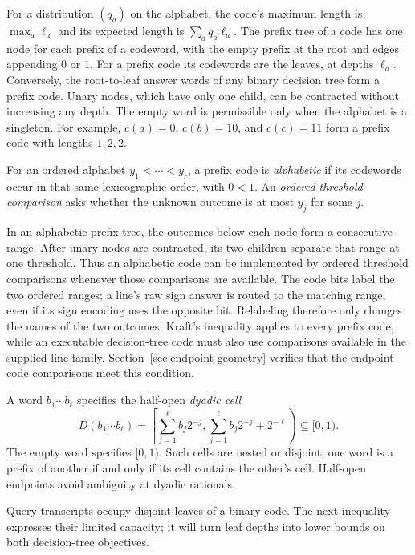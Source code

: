 For a distribution $(q_a)$ on the alphabet, the code's maximum
length is $\max_a\ell_a$ and its expected length is
$\sum_a q_a\ell_a$.
The prefix tree of a code has one node for each prefix of a
codeword, with the empty prefix at the root and edges appending
$0$ or $1$. For a prefix code its codewords are the leaves,
at depths $\ell_a$. Conversely, the root-to-leaf answer words of
any binary decision tree form a prefix code. Unary nodes, which
have only one child, can be contracted without increasing any depth.
The empty word is permissible only when the alphabet is a singleton.
For example, $c(a)=0$, $c(b)=10$, and $c(c)=11$ form a prefix code
with lengths $1,2,2$.

\begin{definition}\label{def:alphabetic-code}
For an ordered alphabet $y_1<\cdots<y_r$, a prefix code is
\emph{alphabetic} if its codewords occur in that same lexicographic
order, with $0<1$. An \emph{ordered threshold comparison} asks
whether the unknown outcome is at most $y_j$ for some $j$.
\end{definition}

In an alphabetic prefix tree, the outcomes below each node form
a consecutive range. After unary nodes are contracted, its two
children separate that range at one threshold. Thus an alphabetic
code can be implemented by ordered threshold comparisons whenever
those comparisons are available. The code bits label the two
ordered ranges; a line's raw sign answer is routed to the matching
range, even if its sign encoding uses the opposite bit. Relabeling
therefore only changes the names of the two outcomes. Kraft's
inequality applies to every prefix
code, while an executable decision-tree code must also use comparisons
available in the supplied line family. Section~\ref{sec:endpoint-geometry}
verifies that the endpoint-code comparisons meet this condition.

A word $b_1\cdots b_\ell$ specifies the half-open \emph{dyadic cell}
\[
 D(b_1\cdots b_\ell)=
 \left[\sum_{j=1}^{\ell}b_j2^{-j},
       \sum_{j=1}^{\ell}b_j2^{-j}+2^{-\ell}\right)
 \subseteq[0,1).
\]
The empty word specifies $[0,1)$. Such cells are nested or disjoint;
one word is a prefix of another if and only if its cell contains
the other's cell. Half-open endpoints avoid ambiguity at dyadic
rationals.

Query transcripts occupy disjoint leaves of a binary code. The next
inequality expresses their limited capacity; it will turn leaf depths
into lower bounds on both decision-tree objectives.

